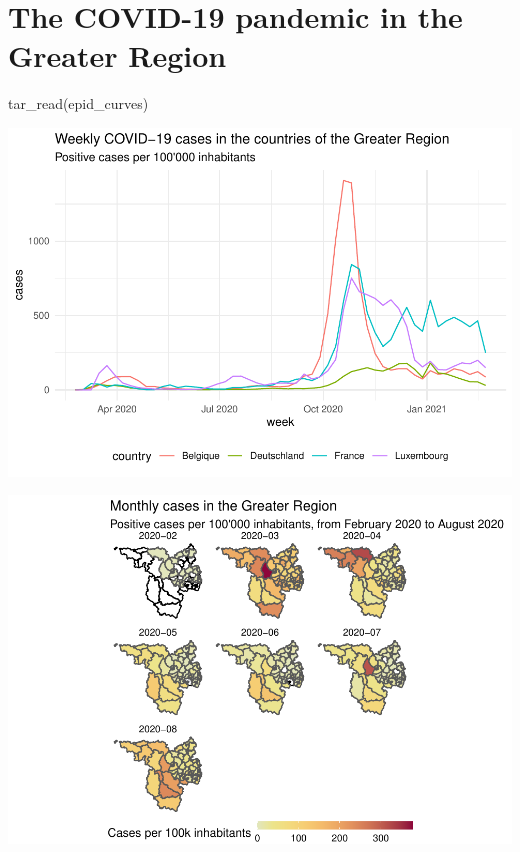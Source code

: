 \documentclass{article}
\newenvironment{Shaded}{\begin{snugshade}}{\end{snugshade}}
\newcommand{\FunctionTok}[1]{\textcolor[rgb]{0.00,0.00,0.00}{#1}}
\newcommand{\NormalTok}[1]{#1}
\newcommand{\SpecialCharTok}[1]{\textcolor[rgb]{0.00,0.00,0.00}{#1}}
\begin{document}
\hypertarget{the-covid-19-pandemic-in-the-greater-region}{%
\section{The COVID-19 pandemic in the Greater
Region}\label{the-covid-19-pandemic-in-the-greater-region}}

\begin{Shaded}
\begin{Highlighting}[]
\FunctionTok{tar\_read}\NormalTok{(epid\_curves)}
\end{Highlighting}
\end{Shaded}

\includegraphics{paper_files/figure-latex/unnamed-chunk-1-1.pdf}

\begin{Shaded}
\end{Shaded}

\includegraphics[width=1\linewidth]{paper_files/figure-latex/unnamed-chunk-2-1}
\end{document}
